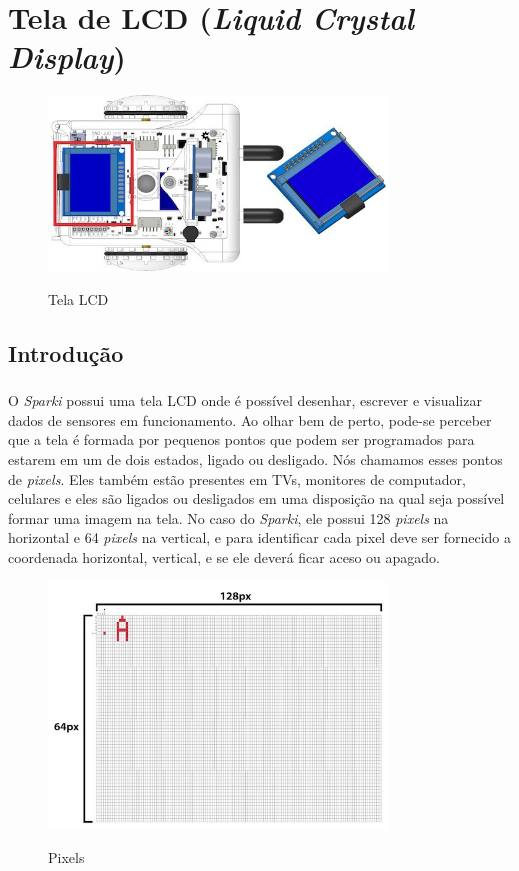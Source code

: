 \chapter{Tela de LCD (\textit{Liquid Crystal Display})}

    \begin{figure}[h]
    \caption{Tela LCD}
     
    \centering 
    \includegraphics[width=9cm]{Figuras/Top_LCD1.jpeg}
    \label{figura:Top_LCD1.jpeg}
    \end{figure}

\section*{Introdução}
\paragraph{}
O \textit{Sparki} possui uma tela LCD onde é possível desenhar, escrever e visualizar dados de sensores em funcionamento. Ao olhar bem de perto, pode-se perceber que a tela é formada por pequenos pontos que podem ser programados para estarem em um de dois estados, ligado ou desligado. Nós chamamos esses pontos de \textit{pixels}. Eles também estão presentes em TVs, monitores de computador, celulares e eles são ligados ou desligados em uma disposição na qual seja possível formar uma imagem na tela. No caso do \textit{Sparki}, ele possui 128 \textit{pixels} na horizontal e 64 \textit{pixels} na vertical, e para identificar cada pixel deve ser fornecido a coordenada horizontal, vertical, e se ele deverá ficar aceso ou apagado. 

    \begin{figure}[h]
    \caption{Pixels}
     
    \centering 
    \includegraphics[width=9cm]{Figuras/LCD_Diagram1.jpg}
    \label{figura:LCD_Diagram1.jpg}
    \end{figure}
    
